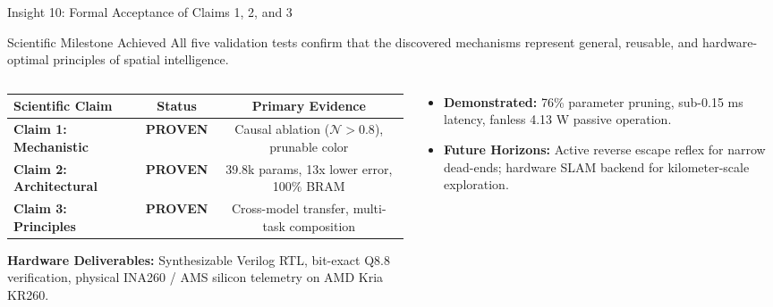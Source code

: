 \documentclass[aspectratio=169, 10pt]{beamer}
\begin{document}
\begin{frame}{Insight 10: Formal Acceptance of Claims 1, 2, and 3}
  \begin{block}{Scientific Milestone Achieved}
    All five validation tests confirm that the discovered mechanisms represent general, reusable, and hardware-optimal principles of spatial intelligence.
  \end{block}
  \vspace{-0.2cm}
  \begin{columns}[T]
    \begin{column}{0.54\textwidth}
      \setlength{\tabcolsep}{2pt}
      \begin{table}
        \centering
        \scriptsize
        \begin{tabular}{lcc}
          \toprule
          \textbf{Scientific Claim} & \textbf{Status} & \textbf{Primary Evidence} \\
          \midrule
          \textbf{Claim 1: Mechanistic} & \textbf{PROVEN} & Causal ablation ($\mathcal{N} > 0.8$), prunable color \\
          \textbf{Claim 2: Architectural} & \textbf{PROVEN} & 39.8k params, 13x lower error, 100\% BRAM \\
          \textbf{Claim 3: Principles} & \textbf{PROVEN} & Cross-model transfer, multi-task composition \\
          \bottomrule
        \end{tabular}
      \end{table}
      \vspace{0.1cm}
      \tiny
      \textbf{Hardware Deliverables:} Synthesizable Verilog RTL, bit-exact Q8.8 verification, physical INA260 / AMS silicon telemetry on AMD Kria KR260.
    \end{column}
    \begin{column}{0.44\textwidth}
      \begin{itemize}
        \item \textbf{Demonstrated:} 76\% parameter pruning, sub-0.15 ms latency, fanless 4.13 W passive operation.
        \item \textbf{Future Horizons:} Active reverse escape reflex for narrow dead-ends; hardware SLAM backend for kilometer-scale exploration.
      \end{itemize}
    \end{column}
  \end{columns}
\end{frame}
\end{document}

